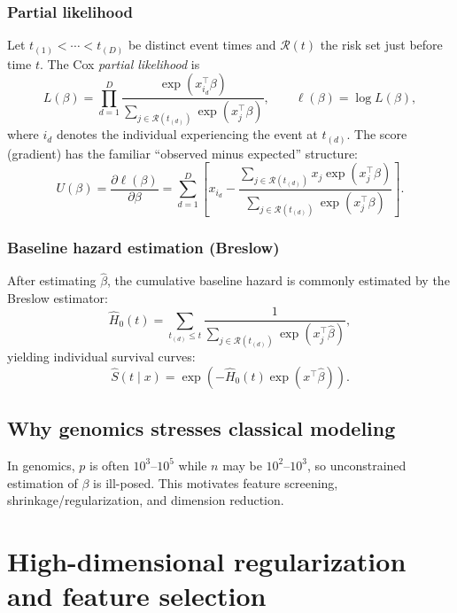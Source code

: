 \documentclass[11pt]{article}
\begin{document}
\subsubsection{Partial likelihood}
Let $t_{(1)}<\cdots<t_{(D)}$ be distinct event times and $\mathcal{R}(t)$ the risk set just before time $t$.
The Cox \emph{partial likelihood} is
\begin{equation}
L(\beta) = \prod_{d=1}^{D} \frac{\exp(x_{i_d}^\top \beta)}{\sum_{j\in \mathcal{R}(t_{(d)})}\exp(x_j^\top \beta)},
\qquad
\ell(\beta)=\log L(\beta),
\label{eq:cox_partial_lik}
\end{equation}
where $i_d$ denotes the individual experiencing the event at $t_{(d)}$.
The score (gradient) has the familiar ``observed minus expected'' structure:
\begin{equation}
U(\beta)=\frac{\partial \ell(\beta)}{\partial \beta}
=
\sum_{d=1}^{D}\left[
x_{i_d}
-
\frac{\sum_{j\in \mathcal{R}(t_{(d)})}x_j\exp(x_j^\top \beta)}{\sum_{j\in \mathcal{R}(t_{(d)})}\exp(x_j^\top \beta)}
\right].
\label{eq:cox_score}
\end{equation}

\subsubsection{Baseline hazard estimation (Breslow)}
After estimating $\hat\beta$, the cumulative baseline hazard is commonly estimated by the Breslow estimator:
\begin{equation}
\hat H_0(t)=\sum_{t_{(d)}\le t}\frac{1}{\sum_{j\in \mathcal{R}(t_{(d)})}\exp(x_j^\top \hat\beta)},
\label{eq:breslow}
\end{equation}
yielding individual survival curves:
\[
\hat S(t\mid x)=\exp\!\left(-\hat H_0(t)\exp(x^\top \hat\beta)\right).
\]

\subsection{Why genomics stresses classical modeling}
In genomics, $p$ is often $10^3$--$10^5$ while $n$ may be $10^2$--$10^3$, so unconstrained estimation of $\beta$ is ill-posed. This motivates feature screening, shrinkage/regularization, and dimension reduction.

\section{High-dimensional regularization and feature selection}
\end{document}
